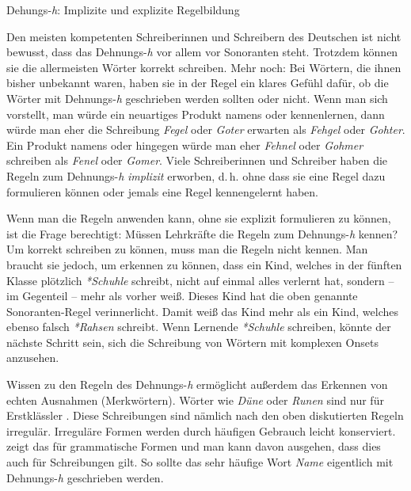 \begin{Exkurs}{Dehungs-\textit{h}: Implizite und explizite Regelbildung}

\noindent Den meisten kompetenten Schreiberinnen und Schreibern des Deutschen ist nicht bewusst, dass das Dehnungs-\textit{h} vor allem vor Sonoranten steht. Trotzdem können sie die allermeisten Wörter korrekt schreiben. Mehr noch: Bei Wörtern, die ihnen bisher unbekannt waren, haben sie in der Regel ein klares Gefühl dafür, ob die Wörter mit Dehnungs-\textit{h} geschrieben werden sollten oder nicht. Wenn man sich vorstellt, man würde ein neuartiges Produkt namens \textipa{[\textprimstress fe:.g@l]} oder \textipa{[\textprimstress go:.t5]} kennenlernen, dann würde man eher die Schreibung \textit{Fegel} oder \textit{Goter} erwarten als \textit{Fehgel} oder \textit{Gohter}. Ein Produkt namens \textipa{[\textprimstress fe:.n@l]} oder \textipa{[\textprimstress go:.m5]} hingegen würde man eher \textit{Fehnel} oder \textit{Gohmer} schreiben als \textit{Fenel} oder \textit{Gomer}. Viele Schreiberinnen und Schreiber haben die Regeln zum Dehnungs-\textit{h} \textit{implizit} erworben, d.\,h. ohne dass sie eine Regel dazu formulieren können oder jemals eine Regel kennengelernt haben.

Wenn man die Regeln anwenden kann, ohne sie explizit formulieren zu können, ist die Frage berechtigt: Müssen Lehrkräfte die Regeln zum Dehnungs-\textit{h} kennen? Um korrekt schreiben zu können, muss man die Regeln nicht kennen. Man braucht sie jedoch, um erkennen zu können, dass ein Kind, welches in der fünften Klasse plötzlich \textit{*Schuhle} schreibt, nicht auf einmal alles verlernt hat, sondern -- im Gegenteil -- mehr als vorher weiß. Dieses Kind hat die oben genannte Sonoranten-Regel verinnerlicht. Damit weiß das Kind mehr als ein Kind, welches ebenso falsch \textit{*Rahsen} schreibt. Wenn Lernende \textit{*Schuhle} schreiben, könnte der nächste Schritt sein, sich die Schreibung von Wörtern mit komplexen Onsets anzusehen. 

Wissen zu den Regeln des Dehnungs-\textit{h} ermöglicht außerdem das Erkennen von echten Ausnahmen (Merkwörtern). Wörter wie \textit{Düne} oder \textit{Runen} sind nur für Erstklässler . Diese Schreibungen sind nämlich nach den oben diskutierten Regeln irregulär. Irreguläre Formen werden durch häufigen Gebrauch leicht konserviert. \citet[115]{croft:2003} zeigt das für grammatische Formen und man kann davon ausgehen, dass dies auch für Schreibungen gilt. So sollte das sehr häufige Wort \textit{Name} eigentlich mit Dehnungs-\textit{h} geschrieben werden. 


\end{Exkurs}
